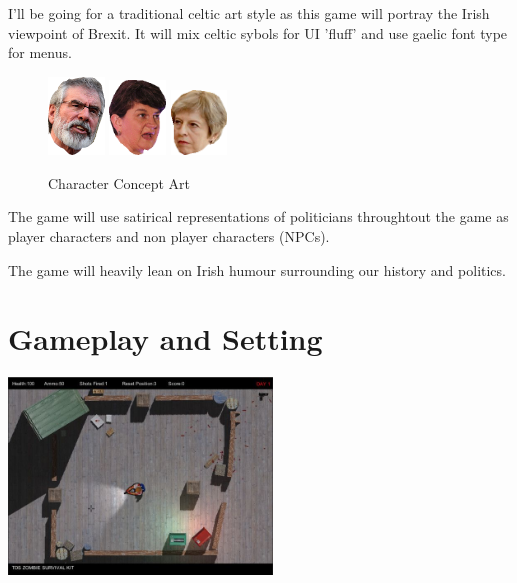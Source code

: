 \documentclass[a4paper]{scrreprt}
\begin{document}
    I'll be going for a traditional celtic art style as this game will portray the Irish viewpoint of Brexit. 
    It will mix celtic sybols for UI 'fluff' and use gaelic font type for menus.

    \begin{figure}[H]
        \begin{addmargin}[13.5em]{0em}
            \includegraphics[width=1.5cm]{gerry-right}
            \includegraphics[width=1.5cm]{arlene}
            \includegraphics[width=1.5cm]{tess}
        \end{addmargin}
        \caption{\label{fig:art} Character Concept Art}
    \end{figure}

    \begin{flushleft}
        The game will use satirical representations of politicians throughtout the game as player characters and non player characters (NPCs).
    \end{flushleft}

    \begin{flushleft}
        The game will heavily lean on Irish humour surrounding our history and politics.
    \end{flushleft}

    \chapter{Gameplay and Setting}

    \begin{center}
        \includegraphics[width=7cm]{top-down}
    \end{center}
\end{document}
